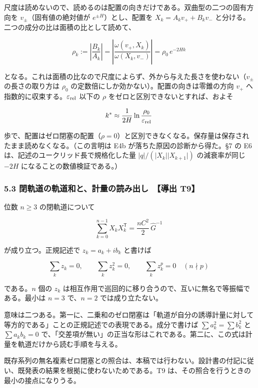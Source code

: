\documentclass[
  a4paper,
]{ltjsarticle}
\begin{document}
尺度は読めないので、読めるのは配置の向きだけである。双曲型の二つの固有方向を
\(v_\pm\)（固有値の絶対値が \(e^{\pm H}\)）とし、配置を
\(X_k=A_kv_++B_kv_-\) と分ける。二つの成分の比は面積の比として読めて、

\[
\rho_k:=\left\lvert\frac{B_k}{A_k}\right\rvert=\left\lvert\frac{\omega(v_+,X_k)}{\omega(X_k,v_-)}\right\rvert=\rho_0\,e^{-2Hk}
\]

となる。これは面積の比なので尺度によらず、外から与えた長さを使わない（\(v_\pm\)
の長さの取り方は \(\rho_0\)
の定数倍にしか効かない）。配置の向きは零錐の方向 \(v_+\)
へ指数的に収束する。\(\varepsilon_{\rm rel}\) 以下の \(\rho\)
をゼロと区別できないとすれば、およそ

\[
k^{*}\approx\frac{1}{2H}\ln\frac{\rho_0}{\varepsilon_{\rm rel}}
\]

歩で、配置はゼロ閉塞の配置（\(\rho=0\)）と区別できなくなる。保存量は保存されたまま読めなくなる。（この言明は
E4b が落ちた原因の診断から得た。§7 の E6
は、記述のユークリッド長で規格化した量
\(\lvert q\rvert/(\lvert X_k\rvert\lvert X_{k+1}\rvert)\) の減衰率が同じ
\(-2H\) になることの数値検証である。）

\subsubsection{5.3 閉軌道の軌道和と、計量の読み出し　【導出
T9】}\label{ux9589ux8eccux9053ux306eux8eccux9053ux548cux3068ux8a08ux91cfux306eux8aadux307fux51faux3057-ux5c0eux51fa-t9}

位数 \(n\ge3\) の閉軌道について

\[
\boxed{\;\sum_{k=0}^{n-1}X_kX_k^{\mathsf T}=\frac{nC^2}{2}\,\hat G^{-1}\;}
\]

が成り立つ。正規記述で \(z_k=a_k+ib_k\) と書けば

\[
\sum_kz_k=0,\qquad\boxed{\sum_kz_k^2=0},\qquad\sum_kz_k^{p}=0\quad(n\nmid p)
\]

である。\(n\) 個の \(z_k\)
は相互作用で巡回的に移り合うので、互いに無名で等振幅である。最小は
\(n=3\) で、\(n=2\) では成り立たない。

意味は二つある。第一に、二乗和のゼロ閉塞は「軌道が自分の誘導計量に対して等方的である」ことの正規記述での表現である。成分で書けば
\(\sum a_k^2=\sum b_k^2\) と \(\sum a_kb_k=0\)
で、「交差項が無い」の正当な形はこれである。第二に、この式は計量を軌道だけから読む手順を与える。

既存系列の無名複素ゼロ閉塞との照合は、本稿では行わない。設計書の付記に従い、既発表の結果を根拠に使わないためである。T9
は、その照合を行うときの最小の接点になりうる。
\end{document}
